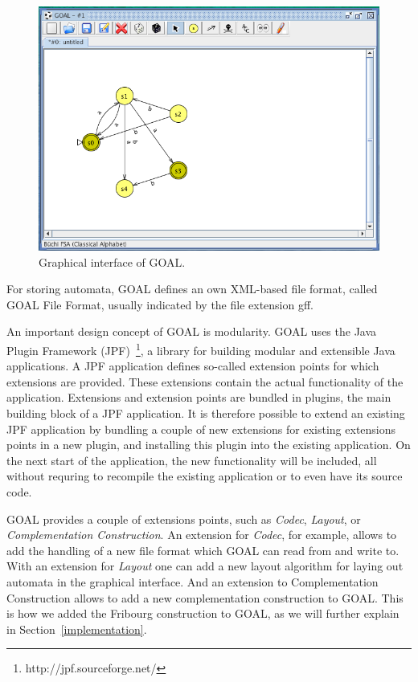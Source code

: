 \begin{figure}
\begin{center}
\includegraphics[scale=0.5]{figures/goal_gui.png}
\caption{Graphical interface of GOAL.}
\label{goal_gui}
\end{center}
\end{figure} 

For storing automata, GOAL defines an own XML-based file format, called GOAL File Format, usually indicated by the file extension gff.

An important design concept of GOAL is modularity. GOAL uses the Java Plugin Framework (JPF)~\footnote{http://jpf.sourceforge.net/}, a library for building modular and extensible Java applications. A JPF application defines so-called extension points for which extensions are provided. These extensions contain the actual functionality of the application. Extensions and extension points are bundled in plugins, the main building block of a JPF application. It is therefore possible to extend an existing JPF application by bundling a couple of new extensions for existing extensions points in a new plugin, and installing this plugin into the existing application. On the next start of the application, the new functionality will be included, all without requring to recompile the existing application or to even have its source code.

GOAL provides a couple of extensions points, such as \textit{Codec}, \textit{Layout}, or \textit{Complementation Construction}. An extension for \textit{Codec}, for example, allows to add the handling of a new file format which GOAL can read from and write to. With an extension for \textit{Layout} one can add a new layout algorithm for laying out automata in the graphical interface. And an extension to \textsf{Complementation Construction} allows to add a new complementation construction to GOAL. This is how we added the Fribourg construction to GOAL, as we will further explain in Section~\ref{implementation}.

